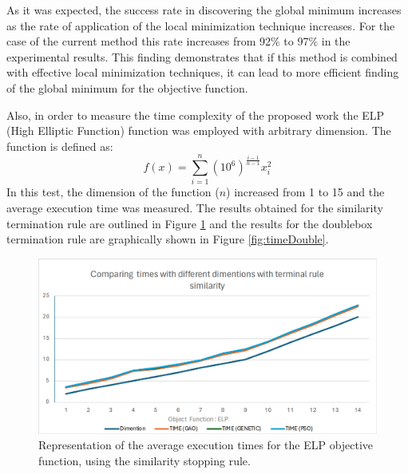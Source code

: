 \documentclass[journal,article,submit,pdftex,moreauthors]{Definitions/mdpi}
\begin{document}
As it was expected, the success rate in discovering the global minimum increases as the rate of application of the local minimization technique increases. For the case of the current method this rate increases from 92\% to 97\% in the experimental results. This finding demonstrates that if this method is combined with effective local minimization techniques, it can lead to more efficient finding of the global minimum for the objective function.

Also, in order to measure the time complexity of the proposed work the ELP (High Elliptic Function) function was employed with arbitrary dimension. The function is defined as:
\[
f(x)=\sum_{i=1}^{n}\left(10^{6}\right)^{\frac{i-1}{n-1}}x_{i}^{2}
\]
In this test, the dimension of the function ($n$) increased from 1 to 15 and the average execution time was measured. The results obtained for the similarity termination rule are outlined in Figure 
\ref{fig:timeSim} and the results for the doublebox termination rule are graphically shown in Figure \ref{fig:timeDouble}.

\begin{figure}[H]
\hspace{-5pt}\includegraphics[scale=0.5]{time_similarity.png}
\caption{Representation of the average execution times for the ELP objective function, using the similarity stopping rule. \label{fig:timeSim}}
\end{figure}
\end{document}
